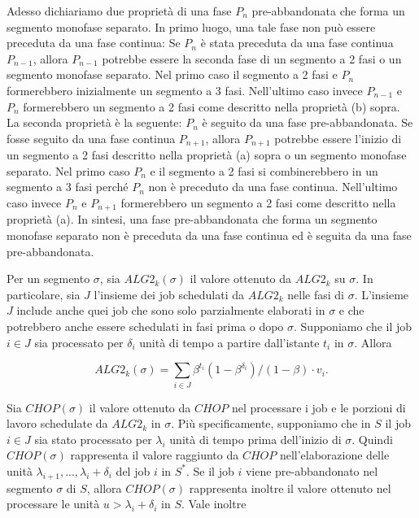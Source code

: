 \documentclass[12pt]{article}
\begin{document}
Adesso dichiariamo due proprietà di una fase $P_{n}$ pre-abbandonata che forma un segmento monofase separato. In primo luogo, una tale fase non può essere preceduta da una fase continua: Se $P_{n}$ è stata preceduta da una fase continua $P_{n-1}$, allora $P_{n-1}$ potrebbe essere la seconda fase di un segmento a 2 fasi o un segmento monofase separato. Nel primo caso il segmento a 2 fasi e $P_{n}$ formerebbero inizialmente un segmento a 3 fasi. Nell'ultimo caso invece $P_{n-1}$ e $P_{n}$ formerebbero un segmento a 2 fasi come descritto nella proprietà (b) sopra. La seconda proprietà è la seguente: $P_{n}$ è seguito da una fase pre-abbandonata. Se fosse seguito da una fase continua $P_{n+1}$, allora $P_{n+1}$ potrebbe essere l'inizio di un segmento a 2 fasi descritto nella proprietà (a) sopra o un segmento monofase separato. Nel primo caso $P_{n}$ e il segmento a 2 fasi si combinerebbero in un segmento a 3 fasi perché $P_{n}$ non è preceduto da una fase continua. Nell'ultimo caso invece $P_{n}$ e $P_{n+1}$ formerebbero un segmento a 2 fasi come descritto nella proprietà (a). In sintesi, una fase pre-abbandonata che forma un segmento monofase separato non è preceduta da una fase continua ed è seguita da una fase pre-abbandonata.

Per un segmento $\sigma$, sia $ALG2_{k}(\sigma)$ il valore ottenuto da $ALG2_{k}$ su $\sigma$. In particolare, sia $J$ l'insieme dei job schedulati da $ALG2_{k}$ nelle fasi di $\sigma$. L'insieme $J$ include anche quei job che sono solo parzialmente elaborati in $\sigma$ e che potrebbero anche essere schedulati in fasi prima o dopo $\sigma$. Supponiamo che il job $i \in J$ sia processato per $\delta_{i}$ unità di tempo a partire dall'istante $t_{i}$ in $\sigma$. Allora

$$ALG2_{k}(\sigma) = \sum_{i \in J} \beta^{t_{i}}(1 - \beta^{\delta_{i}})/(1 - \beta) \cdot v_{i}.$$

Sia $CHOP(\sigma)$ il valore ottenuto da $CHOP$ nel processare i job  e le porzioni di lavoro schedulate da $ALG2_{k}$ in $\sigma$. Più specificamente, supponiamo che in $S$ il job $i \in J$ sia stato processato per $\lambda_{i}$ unità di tempo prima dell'inizio di $\sigma$. Quindi $CHOP(\sigma)$ rappresenta il valore raggiunto da $CHOP$ nell'elaborazione delle unità $\lambda_{i +1}, ..., \lambda_{i} + \delta_{i}$ del job $i$ in $S^{*}$. Se il job $i$ viene pre-abbandonato nel segmento $\sigma$ di $S$, allora $CHOP(\sigma)$ rappresenta inoltre il valore ottenuto nel processare le unità $u > \lambda_{i} + \delta_{i}$ in $S$. Vale inoltre
\end{document}
